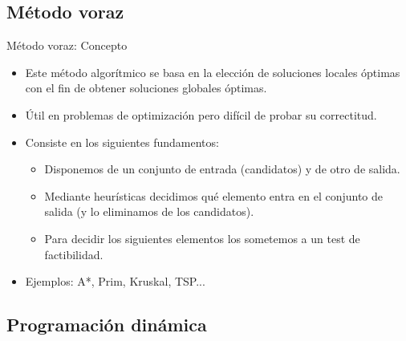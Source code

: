 \documentclass[10pt]{beamer}
\begin{document}
\subsection{Método voraz}
\begin{frame}{Método voraz: Concepto}
  \begin{itemize}
  \item Este método algorítmico se basa en la elección de soluciones locales óptimas
    con el fin de obtener soluciones globales óptimas. \pause
  \item Útil en problemas de optimización pero difícil de probar su correctitud. \pause
  \item Consiste en los siguientes fundamentos: \pause
    \begin{itemize}
    \item Disponemos de un conjunto de entrada (candidatos) y de otro de salida. \pause
    \item Mediante heurísticas decidimos qué elemento entra en el conjunto de salida 
      (y lo eliminamos de los candidatos). \pause
    \item Para decidir los siguientes elementos los sometemos a un test de factibilidad. \pause
    \end{itemize}
    \item Ejemplos: A*, Prim, Kruskal, TSP...
  \end{itemize}
\end{frame}
\subsection{Programación dinámica}
\end{document}
